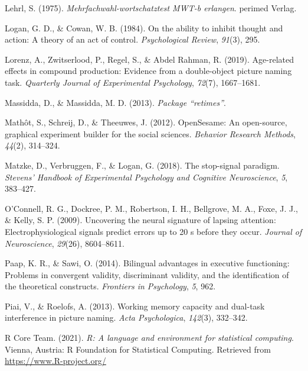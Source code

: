 \documentclass[
  man,floatsintext]{apa6}
\newlength{\cslhangindent}
\newlength{\cslentryspacingunit} %
\newenvironment{CSLReferences}[2] %
 {%
  \setlength{\parindent}{0pt}
  \ifodd #1
  \let\oldpar\par
  \def\par{\hangindent=\cslhangindent\oldpar}
  \fi
  \setlength{\parskip}{#2\cslentryspacingunit}
 }%
 {}
\begin{document}
\begin{CSLReferences}{1}{0}
\leavevmode{}%
Lehrl, S. (1975). \emph{Mehrfachwahl-wortschatztest MWT-b erlangen}. perimed Verlag.

\leavevmode{}%
Logan, G. D., \& Cowan, W. B. (1984). On the ability to inhibit thought and action: A theory of an act of control. \emph{Psychological Review}, \emph{91}(3), 295.

\leavevmode{}%
Lorenz, A., Zwitserlood, P., Regel, S., \& Abdel Rahman, R. (2019). Age-related effects in compound production: Evidence from a double-object picture naming task. \emph{Quarterly Journal of Experimental Psychology}, \emph{72}(7), 1667--1681.

\leavevmode{}%
Massidda, D., \& Massidda, M. D. (2013). \emph{Package {``retimes''}}.

\leavevmode{}%
Mathôt, S., Schreij, D., \& Theeuwes, J. (2012). OpenSesame: An open-source, graphical experiment builder for the social sciences. \emph{Behavior Research Methods}, \emph{44}(2), 314--324.

\leavevmode{}%
Matzke, D., Verbruggen, F., \& Logan, G. (2018). The stop-signal paradigm. \emph{Stevens' Handbook of Experimental Psychology and Cognitive Neuroscience}, \emph{5}, 383--427.

\leavevmode{}%
O'Connell, R. G., Dockree, P. M., Robertson, I. H., Bellgrove, M. A., Foxe, J. J., \& Kelly, S. P. (2009). Uncovering the neural signature of lapsing attention: Electrophysiological signals predict errors up to 20 s before they occur. \emph{Journal of Neuroscience}, \emph{29}(26), 8604--8611.

\leavevmode{}%
Paap, K. R., \& Sawi, O. (2014). Bilingual advantages in executive functioning: Problems in convergent validity, discriminant validity, and the identification of the theoretical constructs. \emph{Frontiers in Psychology}, \emph{5}, 962.

\leavevmode{}%
Piai, V., \& Roelofs, A. (2013). Working memory capacity and dual-task interference in picture naming. \emph{Acta Psychologica}, \emph{142}(3), 332--342.

\leavevmode{}%
R Core Team. (2021). \emph{R: A language and environment for statistical computing}. Vienna, Austria: R Foundation for Statistical Computing. Retrieved from \url{https://www.R-project.org/}


\end{CSLReferences}
\end{document}

